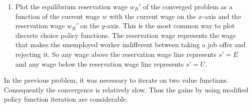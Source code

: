 \begin{problem}
\begin{enumerate}
   \item Plot the equilibrium reservation wage $w_R'$ of the converged problem as a function of the current wage $w$ with the current wage on the $x$-axis and the reservation wage $w_R'$ on the $y$-axis. This is the most common way to plot discrete choice policy functions. The reservation wage represents the wage that makes the unemployed worker indifferent between taking a job offer and rejecting it. So any wage above the reservation wage line represents $s' = E$ and any wage below the reservation wage line represents $s' = U$.

\end{enumerate}
\end{problem}

In the previous problem, it was necessary to iterate on two value functions.  Consequently the convergence is relatively slow.  Thus the gains by using modified policy function iteration are considerable.


